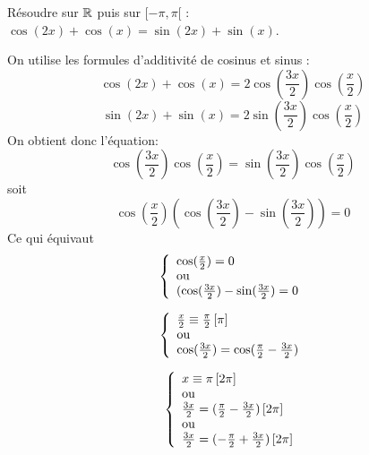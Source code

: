 \documentclass[a4paper, 11pt]{article}
\begin{document}


{\footnotesize
\begin{exo} R\'esoudre sur $\mathbb{R}$ puis sur $\lbrack -\pi,\pi\lbrack$ : $\cos{(2x)}+\cos{(x)}=\sin{(2x)}+\sin{(x)}$.
\end{exo}}

\begin{cor}
On utilise les formules d'additivité de cosinus et sinus : 
$$\cos(2x)+\cos(x)= 2\cos(\frac{3x}{2})\cos(\frac{x}{2})$$
$$\sin(2x)+\sin(x)= 2\sin(\frac{3x}{2})\cos(\frac{x}{2})$$ 
On obtient donc l'équation: 
$$\cos(\frac{3x}{2})\cos(\frac{x}{2}) =\sin(\frac{3x}{2})\cos(\frac{x}{2})$$
soit 
$$\cos(\frac{x}{2})(\cos(\frac{3x}{2})-\sin(\frac{3x}{2}))=0$$
Ce qui équivaut 
$$
\left\{ \begin{array}{l}
\cos(\frac{x}{2})=0 \\
\textmd{ou }\\
(\cos(\frac{3x}{2})-\sin(\frac{3x}{2})=0 
\end{array}\right.$$

$$
\left\{ \begin{array}{l}
\frac{x}{2}\equiv \frac{\pi}{2}\, [\pi] \\
\textmd{ou }\\
\cos(\frac{3x}{2})=\cos(\frac{\pi}{2}-\frac{3x}{2})
\end{array}\right.$$

$$
\left\{ \begin{array}{l}
x\equiv \pi\, [2\pi] \\
\textmd{ou }\\
\frac{3x}{2}=(\frac{\pi}{2}-\frac{3x}{2}) \, [2\pi]\\
\textmd{ou }\\
\frac{3x}{2}=(-\frac{\pi}{2}+\frac{3x}{2}) \, [2\pi]
\end{array}\right.$$

\end{cor}
\end{document}
